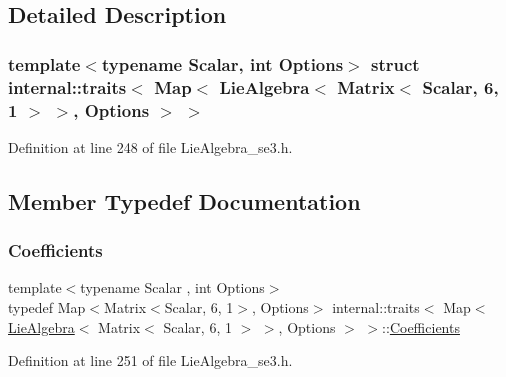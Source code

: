 \subsection{Detailed Description}
\subsubsection*{template$<$typename Scalar, int Options$>$\newline
struct internal\+::traits$<$ Map$<$ Lie\+Algebra$<$ Matrix$<$ Scalar, 6, 1 $>$ $>$, Options $>$ $>$}



Definition at line 248 of file Lie\+Algebra\+\_\+se3.\+h.



\subsection{Member Typedef Documentation}
\hypertarget{structinternal_1_1traits_3_01_map_3_01_lie_algebra_3_01_matrix_3_01_scalar_00_016_00_011_01_4_01_4_00_01_options_01_4_01_4_a3d1c06b436990d5476665a10fc6ec447}{}\label{structinternal_1_1traits_3_01_map_3_01_lie_algebra_3_01_matrix_3_01_scalar_00_016_00_011_01_4_01_4_00_01_options_01_4_01_4_a3d1c06b436990d5476665a10fc6ec447} 
\subsubsection{\texorpdfstring{Coefficients}{Coefficients}}
{\footnotesize\ttfamily template$<$typename Scalar , int Options$>$ \\
typedef Map$<$Matrix$<$Scalar, 6, 1$>$, Options$>$ internal\+::traits$<$ Map$<$ \hyperlink{class_lie_algebra}{Lie\+Algebra}$<$ Matrix$<$ Scalar, 6, 1 $>$ $>$, Options $>$ $>$\+::\hyperlink{structinternal_1_1traits_3_01_map_3_01_lie_algebra_3_01_matrix_3_01_scalar_00_016_00_011_01_4_01_4_00_01_options_01_4_01_4_a3d1c06b436990d5476665a10fc6ec447}{Coefficients}}



Definition at line 251 of file Lie\+Algebra\+\_\+se3.\+h.

